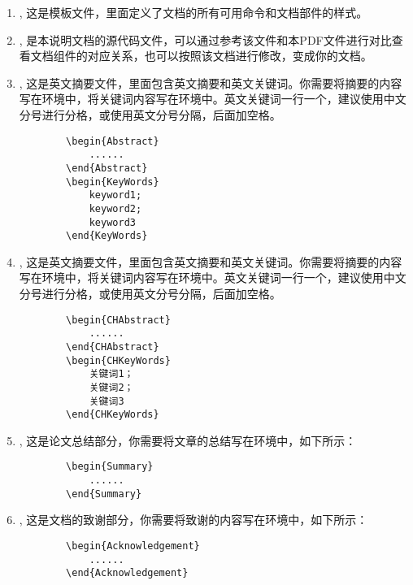 \documentclass{nitthesis}
\begin{document}
\begin{enumerate}
    \item {}, 这是模板文件，里面定义了文档的所有可用命令和文档部件的样式。
    \item {}, 是本说明文档的源代码文件，可以通过参考该文件和本PDF文件进行对比查看文档组件的对应关系，也可以按照该文档进行修改，变成你的文档。
    \item {}, 这是英文摘要文件，里面包含英文摘要和英文关键词。你需要将摘要的内容写在环境中，将关键词内容写在环境中。英文关键词一行一个，建议使用中文分号进行分格，或使用英文分号分隔，后面加空格。
    \begin{lstlisting}
        \begin{Abstract}
            ......
        \end{Abstract}
        \begin{KeyWords}
            keyword1; 
            keyword2; 
            keyword3 
        \end{KeyWords}
    \end{lstlisting}

    \item {}, 这是英文摘要文件，里面包含英文摘要和英文关键词。你需要将摘要的内容写在环境中，将关键词内容写在环境中。英文关键词一行一个，建议使用中文分号进行分格，或使用英文分号分隔，后面加空格。
    \begin{lstlisting}
        \begin{CHAbstract}
            ......
        \end{CHAbstract}
        \begin{CHKeyWords}
            关键词1；
            关键词2；
            关键词3 
        \end{CHKeyWords}
    \end{lstlisting}

    \item {}, 这是论文总结部分，你需要将文章的总结写在环境中，如下所示：
    \begin{lstlisting}
        \begin{Summary}
            ......
        \end{Summary}
    \end{lstlisting}

    \item {}, 这是文档的致谢部分，你需要将致谢的内容写在环境中，如下所示：
    \label{sec.1.1.1}
    \begin{lstlisting}
        \begin{Acknowledgement}
            ......
        \end{Acknowledgement}
    \end{lstlisting}


\end{enumerate}
\end{document}
